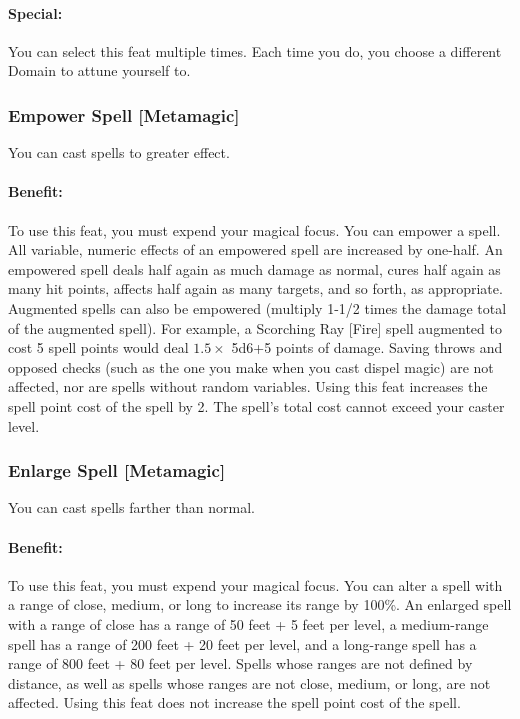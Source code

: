 \paragraph{Special:} You can select this feat multiple times. Each time you do, you choose a different Domain to attune yourself to.
\subsubsection[Empower Spell]{Empower Spell [Metamagic]}
\label{Feat:EmpowerSpell}
You can cast spells to greater effect.

\paragraph{Benefit:} To use this feat, you must expend your magical focus.
You can empower a spell. All variable, numeric effects of an empowered spell are increased by one-half. 
An empowered spell deals half again as much damage as normal, 
cures half again as many hit points, affects half again as many targets, and so forth, as appropriate. 
Augmented spells can also be empowered (multiply 1-1/2 times the damage total of the augmented spell). 
For example, a Scorching Ray [Fire] spell augmented to cost 5 spell points would deal
$1.5 \times$ 5d6+5 points of damage.
Saving throws and opposed checks (such as the one you make when you cast dispel magic) are not affected, 
nor are spells without random variables.
Using this feat increases the spell point cost of the spell by 2. The spell's total cost cannot exceed your caster level.

\subsubsection[Enlarge Spell]{Enlarge Spell [Metamagic]}
\label{Feat:EnlargeSpell}
You can cast spells farther than normal.

\paragraph{Benefit:} To use this feat, you must expend your magical focus. 
You can alter a spell with a range of close, medium, or long to increase its range by 100\%. 
An enlarged spell with a range of close has a range of 50 feet + 5 feet per level, 
a medium-range spell has a range of 200 feet + 20 feet per level, 
and a long-range spell has a range of 800 feet + 80 feet per level.
Spells whose ranges are not defined by distance, as well as spells whose ranges are not close, medium, or long, are not affected.
Using this feat does not increase the spell point cost of the spell.

